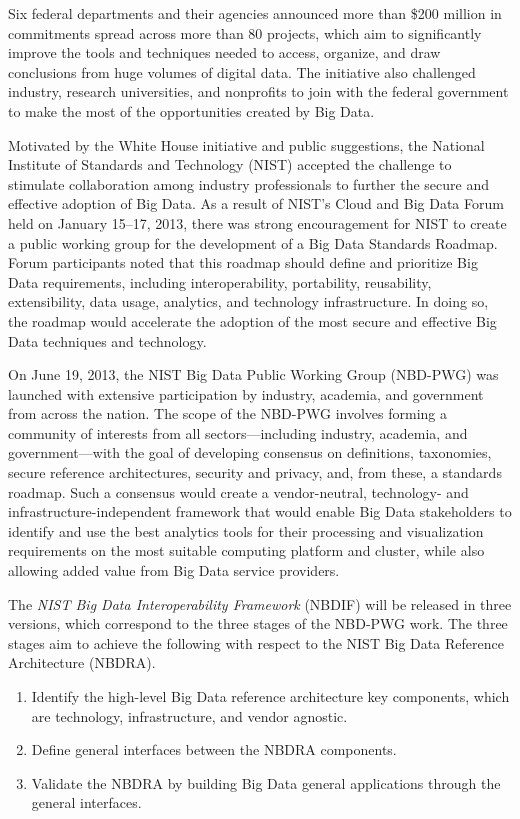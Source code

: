 \documentclass[9pt,]{article}
\providecommand{\tightlist}{%
  \setlength{\itemsep}{0pt}\setlength{\parskip}{0pt}}
\begin{document}
Six federal departments and their agencies announced more than \$200
million in commitments spread across more than 80 projects, which aim to
significantly improve the tools and techniques needed to access,
organize, and draw conclusions from huge volumes of digital data. The
initiative also challenged industry, research universities, and
nonprofits to join with the federal government to make the most of the
opportunities created by Big Data.

Motivated by the White House initiative and public suggestions, the
National Institute of Standards and Technology (NIST) accepted the
challenge to stimulate collaboration among industry professionals to
further the secure and effective adoption of Big Data. As a result of
NIST's Cloud and Big Data Forum held on January 15--17, 2013, there was
strong encouragement for NIST to create a public working group for the
development of a Big Data Standards Roadmap. Forum participants noted
that this roadmap should define and prioritize Big Data requirements,
including interoperability, portability, reusability, extensibility,
data usage, analytics, and technology infrastructure. In doing so, the
roadmap would accelerate the adoption of the most secure and effective
Big Data techniques and technology.

On June 19, 2013, the NIST Big Data Public Working Group (NBD-PWG) was
launched with extensive participation by industry, academia, and
government from across the nation. The scope of the NBD-PWG involves
forming a community of interests from all sectors---including industry,
academia, and government---with the goal of developing consensus on
definitions, taxonomies, secure reference architectures, security and
privacy, and, from these, a standards roadmap. Such a consensus would
create a vendor-neutral, technology- and infrastructure-independent
framework that would enable Big Data stakeholders to identify and use
the best analytics tools for their processing and visualization
requirements on the most suitable computing platform and cluster, while
also allowing added value from Big Data service providers.

The \emph{NIST Big Data Interoperability Framework} (NBDIF) will be
released in three versions, which correspond to the three stages of the
NBD-PWG work. The three stages aim to achieve the following with respect
to the NIST Big Data Reference Architecture (NBDRA).

\begin{enumerate}
\def\labelenumi{\arabic{enumi}.}
\tightlist
\item
  Identify the high-level Big Data reference architecture key
  components, which are technology, infrastructure, and vendor agnostic.
\item
  Define general interfaces between the NBDRA components.
\item
  Validate the NBDRA by building Big Data general applications through
  the general interfaces.
\end{enumerate}
\end{document}
